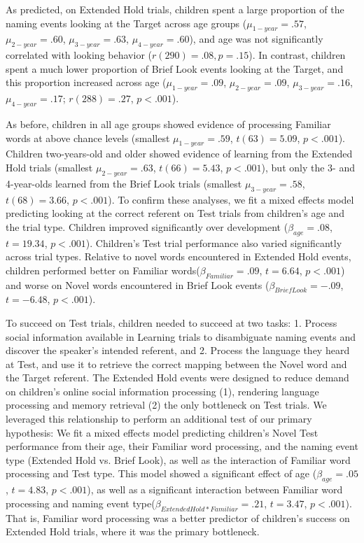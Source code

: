 \documentclass{pnastwo}
\begin{document}
\begin{article}
As predicted, on Extended Hold trials, children spent a large proportion of the naming events looking at the Target across age groups ($\mu_{1-year} = .57$, $\mu_{2-year} = .60$, $\mu_{3-year} = .63$, $\mu_{4-year} = .60$), and age was not significantly correlated with looking behavior ($r(290) = .08, p = .15$). In contrast, children spent a much lower proportion of Brief Look events looking at the Target, and this proportion increased across age ($\mu_{1-year} = .09$, $\mu_{2-year} = .09$, $\mu_{3-year} = .16$, $\mu_{4-year} = .17$; $r(288) = .27$, $p  < .001$).

As before, children in all age groups showed evidence of processing Familiar words at above chance levels (smallest $\mu_{1-year} = .59$, $t(63) = 5.09$, $p < .001$). Children two-years-old and older showed evidence of learning from the Extended Hold trials (smallest $\mu_{2-year} = .63$, $t(66) = 5.43$, $p < .001$), but only the 3- and 4-year-olds learned from the Brief Look trials (smallest $\mu_{3-year} = .58$, $t(68) = 3.66$, $p < .001$). To confirm these analyses, we fit a mixed effects model predicting looking at the correct referent on Test trials from children's age and the trial type. Children improved significantly over development ($\beta_{age} = .08$, $t = 19.34$, $p < . 001$). Children's Test trial performance also varied significantly across trial types. Relative to novel words encountered in Extended Hold events, children performed better on Familiar words($\beta_{Familiar} = .09$, $t = 6.64$, $p < . 001$) and worse on Novel words encountered in Brief Look events ($\beta_{Brief Look} = -.09$, $t = -6.48$, $p < . 001$).

To succeed on Test trials, children needed to succeed at two tasks: 1. Process social information available in Learning trials to disambiguate naming events and discover the speaker's intended referent, and 2. Process the language they heard at Test, and use it to retrieve the correct mapping between the Novel word and the Target referent. The Extended Hold events were designed to reduce demand on children's online social information processing (1), rendering language processing and memory retrieval (2) the only bottleneck on Test trials. We leveraged this relationship to perform an additional test of our primary hypothesis: We fit a mixed effects model predicting children's Novel Test performance from their age, their Familiar word processing, and the naming event type (Extended Hold vs. Brief Look), as well as the interaction of Familiar word processing and Test type. This model showed a significant effect of age ($\beta_{age} = .05$, $t = 4.83$, $p < . 001$), as well as a significant interaction between Familiar word processing and naming event type($\beta_{Extended Hold * Familiar} = .21$, $t = 3.47$, $p < . 001$). That is, Familiar word processing was a better predictor of children's success on Extended Hold trials, where it was the primary bottleneck.


\end{article}
\end{document}
